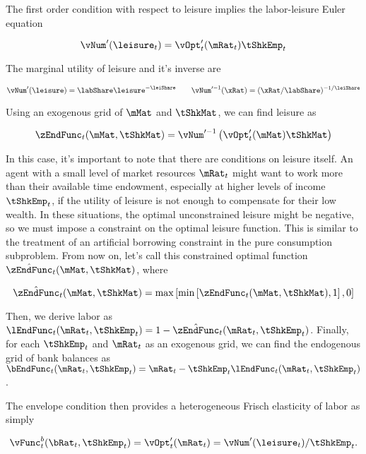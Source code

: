\documentclass[\econtexRoot/SequentialEGM]{subfiles}
\begin{document}
The first order condition with respect to leisure implies the labor-leisure Euler equation

\begin{equation}
	\vNum'(\leisure_{t}) =	\vOpt_{t}'(\mRat_{t}) \tShkEmp_{t}
\end{equation}

The marginal utility of leisure and it's inverse are

\begin{equation}
	\vNum'(\leisure) = \labShare\leisure^{-\leiShare} \qquad
	\vNum'^{-1}(\xRat) = (\xRat/\labShare)^{-1/\leiShare}
\end{equation}

Using an exogenous grid of $\mMat$ and $\tShkMat$, we can find leisure as

\begin{equation}
	\zEndFunc_{t}(\mMat, \tShkMat) = \vNum'^{-1}\left(
	\vOpt_{t}'(\mMat) \tShkMat \right)
\end{equation}

In this case, it's important to note that there are conditions on leisure itself. An agent with a small level of market resources $\mRat_{t}$ might want to work more than their available time endowment, especially at higher levels of income $\tShkEmp_{t}$, if the utility of leisure is not enough to compensate for their low wealth. In these situations, the optimal unconstrained leisure might be negative, so we must impose a constraint on the optimal leisure function. This is similar to the treatment of an artificial borrowing constraint in the pure consumption subproblem. From now on, let's call this constrained optimal function $\hat{\zEndFunc}_{t}(\mMat, \tShkMat)$, where

\begin{equation}
	\hat{\zEndFunc}_{t}(\mMat, \tShkMat) = \max \left[ \min \left[ \zEndFunc_{t}(\mMat, \tShkMat), 1 \right], 0 \right]
\end{equation}

Then, we derive labor as $\lEndFunc_{t}(\mRat_{t}, \tShkEmp_{t}) = 1 -
	\hat{\zEndFunc}_{t}(\mRat_{t}, \tShkEmp_{t})$. Finally, for each
$\tShkEmp_{t}$ and
$\mRat_{t}$ as an exogenous grid, we can find the endogenous grid of bank
balances as $\bEndFunc_{t}(\mRat_{t}, \tShkEmp_{t}) = \mRat_{t} -
	\tShkEmp_{t}\lEndFunc_{t}(\mRat_{t}, \tShkEmp_{t})$.

The envelope condition then provides a heterogeneous Frisch elasticity of labor as simply

\begin{equation}
	\vFunc_{t}^{b}(\bRat_{t}, \tShkEmp_{t}) = \vOpt_{t}'(\mRat_{t}) =
	\vNum'(\leisure_{t})/\tShkEmp_{t}.
\end{equation}
\end{document}
